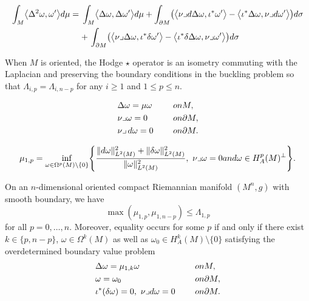 \documentclass[10pt,a4paper]{amsart}
\begin{document}
\begin{align}
\nonumber\int_M\bigl\langle\Delta^2\omega,\omega'\bigr\rangle {\rm d}\mu ={}& \int_M\bigl\langle\Delta \omega,\Delta\omega'\bigr\rangle {\rm d}\mu+\int_{\partial M}\bigl(\bigl\langle\nu\lrcorner {\rm d}\Delta\omega,\iota^*\omega'\bigr\rangle-\bigl\langle\iota^*\Delta\omega,\nu\lrcorner {\rm d}\omega'\bigr\rangle\bigr){\rm d}\sigma\\
 &{}{+}\,\int_{\partial M}\bigl(\bigl\langle\nu\lrcorner\Delta\omega,\iota^*\delta\omega'\bigr\rangle-\bigl\langle\iota^*\delta\Delta\omega,\nu\lrcorner\omega'\bigr\rangle\bigr){\rm d}\sigma\label{eq:partialintegDelta2omega}
\end{align}

\begin{Remark}\label{SymmetryBuck}
When $M$ is oriented, the Hodge $\star$ operator is an isometry commuting with the Laplacian and preserving the boundary conditions in the buckling problem so that $\Lambda_{i,p}=\Lambda_{i,n-p}$ for any $i\geq 1$ and $1\leq p\leq n$.
\end{Remark}

\begin{equation}\label{eq:Neumannpblonpforms}
\begin{aligned}
&\Delta \omega =\mu \omega\ \quad &&\textrm{on } M, \\
&\nu\lrcorner\omega =0\ \quad&&\textrm{on }\partial M, \\
&\nu\lrcorner\,{\rm d}\omega = 0\ \quad &&\textrm{on }\partial M.
\end{aligned}
\end{equation}

\begin{equation}\label{VC_Absolute}
\mu_{1,p}=\inf_{\omega\in\Omega^p(M)\setminus\{0\}}\Biggl\{\frac{\|{\rm d}\omega\|_{L^2(M)}^2+\|\delta\omega\|_{L^2(M)}^2}{\|\omega\|_{L^2(M)}^2},\ \nu\lrcorner\omega=0\textrm{ and }\omega\in H_A^p(M)^\perp\Biggr\}.
\end{equation}

\begin{Theorem}\label{BuckAbs}
On an $n$-dimensional oriented compact Riemannian manifold $(M^n,g)$ with smooth boundary, we have
\begin{equation}\label{BuckAbs1}
\max(\mu_{1,p},\mu_{1,n-p})\leq\Lambda_{1,p}
\end{equation}
for all $p=0,\dots,n$. Moreover, equality occurs for some $p$ if and only if there exist $k\in\{p,n-p\}$, $\omega\in\Omega^k(M)$ as well as $\omega_0\in H_A^k(M)\setminus\{0\}$ satisfying the overdetermined boundary value problem%
\begin{equation}\label{ODP}
\begin{aligned}
&\Delta \omega =\mu_{1,k} \omega \ \quad&&\textrm{on } M, \\
&\omega = \omega_0 \ \quad&& \textrm{on }\partial M,\\
&\iota^*(\delta\omega) =0,\ \nu\lrcorner {\rm d}\omega =0 \ \quad&& \textrm{on }\partial M.
\end{aligned}
\end{equation}
\end{Theorem}
\end{document}
